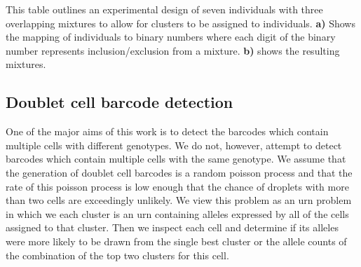 \begin{table}


\caption{Experimental design for matching individuals to clusters}\label{table:multiplex}
\hfil
{}
\par{This table outlines an experimental design of seven individuals with three overlapping mixtures to allow for clusters to be assigned to individuals. \textbf{a)} Shows the mapping of individuals to binary numbers where each digit of the binary number represents inclusion/exclusion from a mixture. \textbf{b)} shows the resulting mixtures.}

\end{table}




\subsection{Doublet cell barcode detection}
\par{
One of the major aims of this work is to detect the barcodes which contain multiple cells with different genotypes. 
We do not, however, attempt to detect barcodes which contain multiple cells with the same genotype. We assume that 
the generation of doublet cell barcodes is a random poisson process and that the rate of this poisson process is low enough that 
the chance of droplets with more than two cells are exceedingly unlikely. We view this problem 
as an urn problem in which we each cluster is an urn containing alleles expressed by all of the cells assigned to that cluster. Then we inspect each cell and determine if its alleles were more likely to be drawn from the single best cluster or the allele counts of
the combination of the top two clusters for this cell.
}





